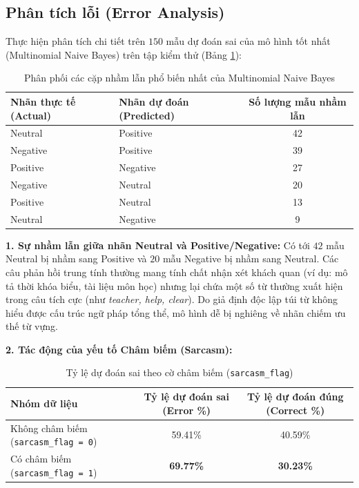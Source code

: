 \documentclass[12pt,a4paper]{article}
\begin{document}
\subsection{Phân tích lỗi (Error Analysis)}
Thực hiện phân tích chi tiết trên $150$ mẫu dự đoán sai của mô hình tốt nhất (Multinomial Naive Bayes) trên tập kiểm thử (Bảng \ref{tab:error_pairs}):

\begin{table}[H]
\centering
\caption{Phân phối các cặp nhầm lẫn phổ biến nhất của Multinomial Naive Bayes}
\label{tab:error_pairs}
\begin{tabular}{llc}
\toprule
\textbf{Nhãn thực tế (Actual)} & \textbf{Nhãn dự đoán (Predicted)} & \textbf{Số lượng mẫu nhầm lẫn} \\
\midrule
Neutral & Positive & 42 \\
Negative & Positive & 39 \\
Positive & Negative & 27 \\
Negative & Neutral & 20 \\
Positive & Neutral & 13 \\
Neutral & Negative & 9 \\
\bottomrule
\end{tabular}
\end{table}

\textbf{1. Sự nhầm lẫn giữa nhãn Neutral và Positive/Negative:}
Có tới $42$ mẫu Neutral bị nhầm sang Positive và $20$ mẫu Negative bị nhầm sang Neutral. Các câu phản hồi trung tính thường mang tính chất nhận xét khách quan (ví dụ: mô tả thời khóa biểu, tài liệu môn học) nhưng lại chứa một số từ thường xuất hiện trong câu tích cực (như \textit{teacher, help, clear}). Do giả định độc lập túi từ không hiểu được cấu trúc ngữ pháp tổng thể, mô hình dễ bị nghiêng về nhãn chiếm ưu thế từ vựng.

\textbf{2. Tác động của yếu tố Châm biếm (Sarcasm):}
\begin{table}[H]
\centering
\caption{Tỷ lệ dự đoán sai theo cờ châm biếm (\texttt{sarcasm\_flag})}
\label{tab:sarcasm_err}
\begin{tabular}{lcc}
\toprule
\textbf{Nhóm dữ liệu} & \textbf{Tỷ lệ dự đoán sai (Error \%)} & \textbf{Tỷ lệ dự đoán đúng (Correct \%)} \\
\midrule
Không châm biếm (\texttt{sarcasm\_flag = 0}) & 59.41\% & 40.59\% \\
Có châm biếm (\texttt{sarcasm\_flag = 1}) & \textbf{69.77\%} & \textbf{30.23\%} \\
\bottomrule
\end{tabular}
\end{table}
\end{document}
